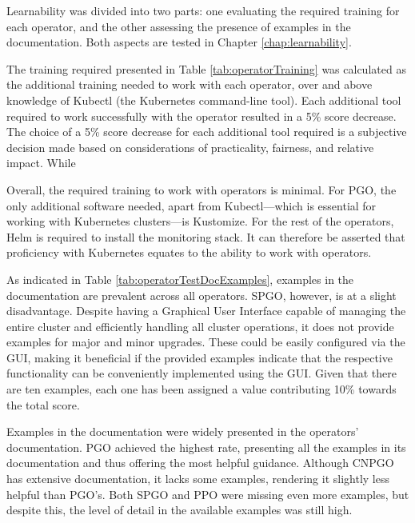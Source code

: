 Learnability was divided into two parts: one evaluating the required training for each operator, and the other assessing the presence of examples in the documentation.
Both aspects are tested in Chapter \ref{chap:learnability}.

The training required presented in Table \ref{tab:operatorTraining} was calculated as the additional training needed to work with each operator, over and above knowledge of Kubectl (the Kubernetes command-line tool).
Each additional tool required to work successfully with the operator resulted in a 5\% score decrease. The choice of a 5\% score decrease for each additional tool required is a subjective decision made based on considerations of practicality, fairness, and relative impact. While

Overall, the required training to work with operators is minimal. For PGO, the only additional software needed, apart from Kubectl—which is essential for working with Kubernetes clusters—is Kustomize.
For the rest of the operators, Helm is required to install the monitoring stack. It can therefore be asserted that proficiency with Kubernetes equates to the ability to work with operators.


As indicated in Table \ref{tab:operatorTestDocExamples}, examples in the documentation are prevalent across all operators. SPGO, however, is at a slight disadvantage.
Despite having a Graphical User Interface capable of managing the entire cluster and efficiently handling all cluster operations, it does not provide examples for major and minor upgrades.
These could be easily configured via the GUI, making it beneficial if the provided examples indicate that the respective functionality can be conveniently implemented using the GUI.
Given that there are ten examples, each one has been assigned a value contributing 10\% towards the total score.

Examples in the documentation were widely presented in the operators' documentation.
PGO achieved the highest rate, presenting all the examples in its documentation and thus offering the most helpful guidance.
Although CNPGO has extensive documentation, it lacks some examples, rendering it slightly less helpful than PGO's.
Both SPGO and PPO were missing even more examples, but despite this, the level of detail in the available examples was still high.

